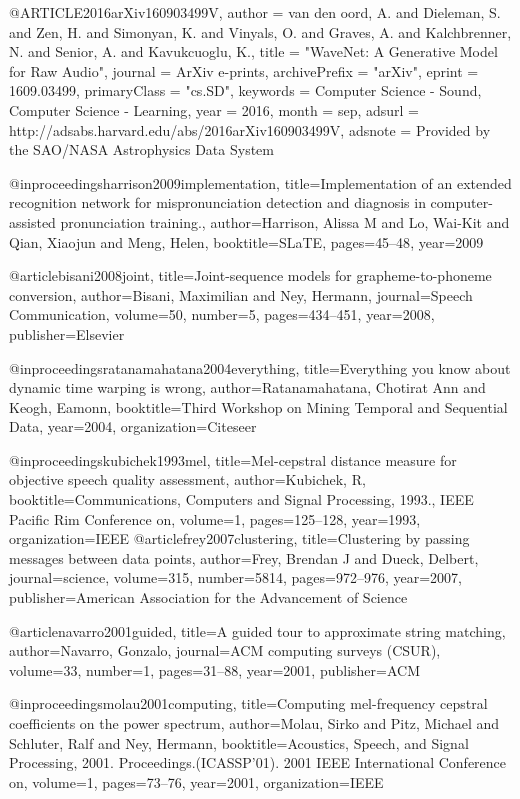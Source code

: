 @ARTICLE{2016arXiv160903499V,
   author = {{van den oord}, A. and {Dieleman}, S. and {Zen}, H. and {Simonyan}, K. and 
	{Vinyals}, O. and {Graves}, A. and {Kalchbrenner}, N. and {Senior}, A. and 
	{Kavukcuoglu}, K.},
    title = "{WaveNet: A Generative Model for Raw Audio}",
  journal = {ArXiv e-prints},
archivePrefix = "arXiv",
   eprint = {1609.03499},
 primaryClass = "cs.SD",
 keywords = {Computer Science - Sound, Computer Science - Learning},
     year = 2016,
    month = sep,
   adsurl = {http://adsabs.harvard.edu/abs/2016arXiv160903499V},
  adsnote = {Provided by the SAO/NASA Astrophysics Data System}
}

@inproceedings{harrison2009implementation,
  title={Implementation of an extended recognition network for mispronunciation detection and diagnosis in computer-assisted pronunciation training.},
  author={Harrison, Alissa M and Lo, Wai-Kit and Qian, Xiaojun and Meng, Helen},
  booktitle={SLaTE},
  pages={45--48},
  year={2009}
}

@article{bisani2008joint,
  title={Joint-sequence models for grapheme-to-phoneme conversion},
  author={Bisani, Maximilian and Ney, Hermann},
  journal={Speech Communication},
  volume={50},
  number={5},
  pages={434--451},
  year={2008},
  publisher={Elsevier}
}

@inproceedings{ratanamahatana2004everything,
  title={Everything you know about dynamic time warping is wrong},
  author={Ratanamahatana, Chotirat Ann and Keogh, Eamonn},
  booktitle={Third Workshop on Mining Temporal and Sequential Data},
  year={2004},
  organization={Citeseer}
}

@inproceedings{kubichek1993mel,
  title={Mel-cepstral distance measure for objective speech quality assessment},
  author={Kubichek, R},
  booktitle={Communications, Computers and Signal Processing, 1993., IEEE Pacific Rim Conference on},
  volume={1},
  pages={125--128},
  year={1993},
  organization={IEEE}
}
@article{frey2007clustering,
  title={Clustering by passing messages between data points},
  author={Frey, Brendan J and Dueck, Delbert},
  journal={science},
  volume={315},
  number={5814},
  pages={972--976},
  year={2007},
  publisher={American Association for the Advancement of Science}
}

@article{navarro2001guided,
  title={A guided tour to approximate string matching},
  author={Navarro, Gonzalo},
  journal={ACM computing surveys (CSUR)},
  volume={33},
  number={1},
  pages={31--88},
  year={2001},
  publisher={ACM}
}

@inproceedings{molau2001computing,
  title={Computing mel-frequency cepstral coefficients on the power spectrum},
  author={Molau, Sirko and Pitz, Michael and Schluter, Ralf and Ney, Hermann},
  booktitle={Acoustics, Speech, and Signal Processing, 2001. Proceedings.(ICASSP'01). 2001 IEEE International Conference on},
  volume={1},
  pages={73--76},
  year={2001},
  organization={IEEE}
}

